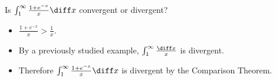 \begin{frame}
\begin{example} %
Is $\int_1^\infty \frac{1+e^{-x}}{x}\diff x$ convergent or divergent?

\begin{itemize}
\item<2->  $\frac{1+e^{-x}}{x} > \frac{1}{x}$.
\item<3->  By a previously studied example, $\int_1^\infty \frac{\diff x}{x}$ is divergent.
\item<4->  Therefore $\int_1^\infty \frac{1+e^{-x}}{x}\diff x$ is divergent by the Comparison Theorem.
\end{itemize}
\end{example}
\end{frame}
